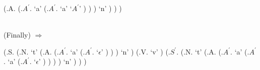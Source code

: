 \documentclass[fleqn]{article}
\begin{document}
\begin{enumerate}
\begin{parsetree}
          (.A.
            (.$A^{\prime}$.
              `a'
              (.$A^{\prime}$.
                `a'
                `$A^{\prime}$'
              )
            )
          )
          `n'
        )
      )
    )
  \end{parsetree}\\
  (Finally) $\Longrightarrow$
  \begin{parsetree}
    (.S.
      (.N.
        `t'
        (.A.
          (.$A^{\prime}$.
            `a'
            (.$A^{\prime}$.
              `$\epsilon$'
            )
          )
        )
        `n'
      )
      (.V.
        `v'
      )
      (.$S^{\prime}$.
        (.N.
          `t'
          (.A.
            (.$A^{\prime}$.
              `a'
              (.$A^{\prime}$.
                `a'
                (.$A^{\prime}$.
                  `$\epsilon$'
                )
              )
            )
          )
          `n'
        )
      )
    )
  \end{parsetree}
\end{enumerate}
\end{document}

